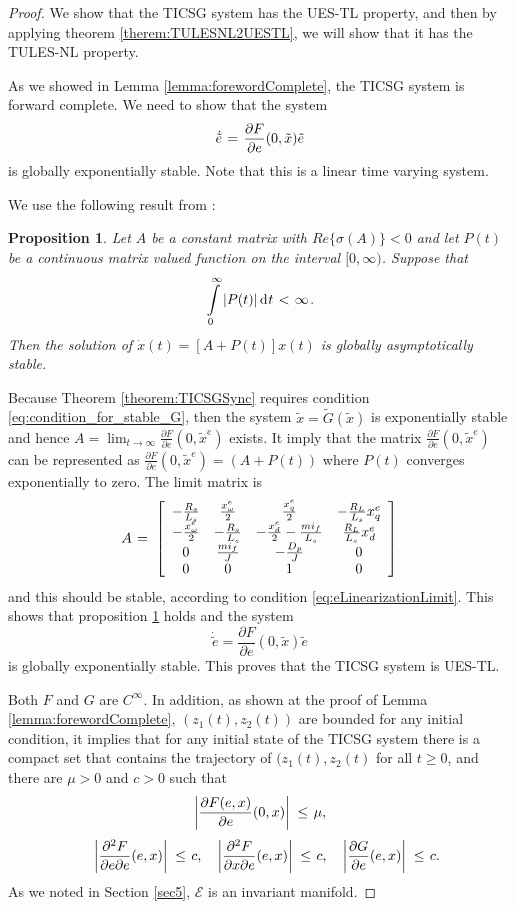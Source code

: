 \documentclass[letterpaper, 10 pt, conference]{ieeeconf}
\newtheorem{proposition}[theorem]{Proposition}
\renewcommand{\o}    {{\omega}}
\newcommand{\m}      {{\hbox{\hskip 1pt}}}
\newcommand{\dd}     {{\rm d\hbox{\hskip 0.5pt}}}
\newcommand{\Emscr}  {{\mathcal{E}}}
\begin{document}
\begin{proof}
We show that the TICSG system has the UES-TL property, and then by
applying theorem \ref{therem:TULESNL2UESTL}, we will show that it has
the TULES-NL property.

As we showed in Lemma \ref{lemma:forewordComplete}, the TICSG system
is forward complete. We need to show that the system
$$ \dot{\tilde{e}} \m=\m \frac{\partial F}{\partial e}(0,\tilde{x})
   \tilde{e}$$
is globally exponentially stable. Note that this is a linear time
varying system.

We use the following result from \cite[Theorem 4.2.7]
{SchovanecGilliam1999}:

\begin{proposition}\label{proposition:LTVStability}
Let $A$ be a constant matrix with $Re\{\sigma(A)\}<0$ and let $P(t)$
be a continuous matrix valued function on the interval
$[0,\infty)$. Suppose that
$$\intop_0^\infty \left|P(t)\right| \dd t \m<\m \infty \m.$$
Then the solution of $\dot{x}(t)=[A+P(t)]x(t)$ is globally 
asymptotically stable.
\end{proposition}
 
Because Theorem \ref{theorem:TICSGSync} requires condition
\eqref{eq:condition_for_stable_G}, then the system $\tilde{x}=
\tilde{G}(\tilde{x})$ is exponentially stable and hence $A =
\lim_{t \to \infty}\frac{\partial F}{\partial e}(0,\tilde{x}^e)$
exists.  It imply that the matrix $\frac{\partial F}{\partial
e}(0,\tilde{x}^e)$ can be represented as $\frac{\partial F}{\partial
e}(0,\tilde{x}^e) = \left(A+P(t)\right)$ where $P(t)$ converges
exponentially to zero. The limit matrix is
$$ A \m=\m \left[\begin{array}{cccc} -\frac{R_{s}}{L_s} & 
   \frac{x^e_\o}{2} & \frac{x^e_q}{2} & -\frac{R_L}{L_s} x^e_q\\
   -\frac{x^e_\o}{2} & -\frac{R_s}{L_s} & -\frac{x^e_d}{2}-\frac
   {mi_f}{L_s} & \frac{R_L}{L_s} x^e_d\\ 0 & \frac{mi_f}{J} & 
   -\frac{D_p}{J} & 0\\ 0 & 0 & 1 & 0 \end{array}\right]$$
and this should be stable, according to condition
\eqref{eq:eLinearizationLimit}. This shows that proposition
\ref{proposition:LTVStability} holds and the system
$$ \dot{\tilde{e}}=\frac{\partial F}{\partial e}(0,\tilde{x})
   \tilde{e}$$
is globally exponentially stable. This proves that the TICSG system
is UES-TL. 

Both $F$ and $G$ are $C^\infty$. In addition, as shown at the proof of
Lemma \ref{lemma:forewordComplete}, $\left(z_1(t),z_2(t)\right)$ are
bounded for any initial condition, it implies that for any initial
state of the TICSG system there is a compact set that contains the
trajectory of $(z_1(t),z_2(t)$ for all $t\geq 0$, and there are
$\mu>0$ and $c>0$ such that
$$\left|\frac{\partial F(e,x)}{\partial e}(0,x)\right| \m\leq\m \mu,$$
$$ \quad \left| \frac{\partial^2 F}{\partial e \partial e}(e,x)\right|
   \m\leq\m c, \quad \left| \frac{\partial^2 F}{\partial x \partial e}
   (e,x)\right| \m\leq\m c,\quad\left| \frac{\partial G}{\partial e}
   (e,x) \right| \m\leq\m c.$$
As we noted in Section \ref{sec5}, $\Emscr$ is an invariant manifold.


\end{proof}
\end{document}
